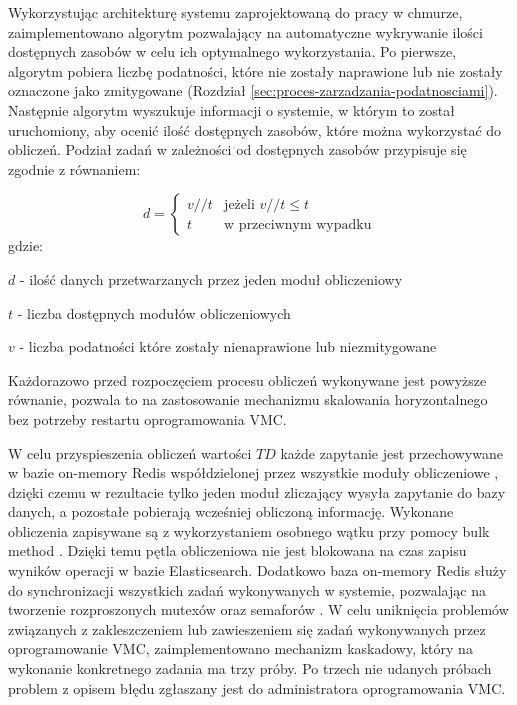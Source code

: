 \bigbreak
Wykorzystując architekturę systemu zaprojektowaną do pracy w chmurze, zaimplementowano algorytm pozwalający na automatyczne wykrywanie ilości dostępnych zasobów w celu ich optymalnego wykorzystania. Po pierwsze, algorytm pobiera liczbę podatności, które nie zostały naprawione lub nie zostały oznaczone jako zmitygowane (Rozdział \ref{sec:proces-zarzadzania-podatnosciami}). Następnie algorytm wyszukuje informacji o systemie, w którym to został uruchomiony, aby ocenić ilość dostępnych zasobów, które można wykorzystać do obliczeń. Podział zadań w zależności od dostępnych zasobów przypisuje się zgodnie z równaniem:

\begin{equation}
d = 
\begin{cases}
\label{eq:chapter3:split_alg}
v//t & \text{jeżeli } v//t \leq t \\
t & \text{w przeciwnym wypadku} 
\end{cases}
\end{equation}
gdzie:
\begin{description}
\item $d$ - ilość danych przetwarzanych przez jeden moduł obliczeniowy
\item $t$ - liczba dostępnych modułów obliczeniowych
\item $v$ - liczba podatności które zostały nienaprawione lub niezmitygowane
\end{description}

\bigbreak
Każdorazowo przed rozpoczęciem procesu obliczeń wykonywane jest powyższe równanie, pozwala to na zastosowanie mechanizmu skalowania horyzontalnego bez potrzeby restartu oprogramowania VMC.

\bigbreak
W celu przyspieszenia obliczeń wartości $TD$ każde zapytanie jest przechowywane w bazie on-memory Redis współdzielonej przez wszystkie moduły obliczeniowe \cite{chen2016towards}, dzięki czemu w rezultacie tylko jeden moduł zliczający wysyła zapytanie do bazy danych, a pozostałe pobierają wcześniej obliczoną informację. Wykonane obliczenia zapisywane są z wykorzystaniem osobnego wątku przy pomocy bulk method \cite{dixit2016elasticsearch}. Dzięki temu pętla obliczeniowa nie jest blokowana na czas zapisu wyników operacji w bazie Elasticsearch. Dodatkowo baza on-memory Redis służy do synchronizacji wszystkich zadań wykonywanych w systemie, pozwalając na tworzenie rozproszonych mutexów oraz semaforów \cite{yadav2015review}. W celu uniknięcia problemów związanych z zakleszczeniem lub zawieszeniem się zadań wykonywanych przez oprogramowanie VMC, zaimplementowano mechanizm kaskadowy, który na wykonanie konkretnego zadania ma trzy próby. Po trzech nie udanych próbach problem z opisem błędu zgłaszany jest do administratora oprogramowania VMC.

